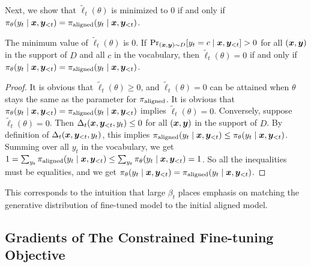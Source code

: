Next, we show that $\tilde{\ell}_t(\theta)$ is minimized to $0$ if and only if $\pi_{\theta}(y_t \mid \bm{x}, \bm{y}_{<t}) = \pi_{\mathrm{aligned}}(y_t \mid \bm{x}, \bm{y}_{<t})$.
\begin{theorem} \label{thm:relu_loss_min}
    The minimum value of $\tilde{\ell}_t(\theta)$ is $0$.
    If $\Pr_{(\bm{x}, \bm{y}) \sim D}[y_t = c \mid \bm{x}, \bm{y}_{<t}] > 0$ for all $(\bm{x}, \bm{y})$ in the support of $D$ and all $c$ in the vocabulary,
    then $\tilde{\ell}_t(\theta) = 0$ if and only if $\pi_{\theta}(y_t \mid \bm{x}, \bm{y}_{<t}) = \pi_{\mathrm{aligned}}(y_t \mid \bm{x}, \bm{y}_{<t})$.
\end{theorem}
\begin{proof}
    It is obvious that $\tilde{\ell}_t(\theta) \ge 0$, and $\tilde{\ell}_t(\theta) = 0$ can be attained when $\theta$ stays the same as the parameter for $\pi_{\mathrm{aligned}}$. It is obvious that  $\pi_{\theta}(y_t \mid \bm{x}, \bm{y}_{<t}) = \pi_{\mathrm{aligned}}(y_t \mid \bm{x}, \bm{y}_{<t})$
    implies $\tilde{\ell}_t(\theta) = 0$.
    Conversely, suppose $\tilde{\ell}_t(\theta) = 0$.
    Then $\Delta_t(\bm{x}, \bm{y}_{<t}, y_t) \le 0$ for all $(\bm{x}, \bm{y})$ in the support of $D$.
    By definition of $\Delta_t(\bm{x}, \bm{y}_{<t}, y_t)$, this implies $\pi_{\mathrm{aligned}}(y_t \mid \bm{x}, \bm{y}_{<t}) \le \pi_{\theta}(y_t \mid \bm{x}, \bm{y}_{<t})$.
    Summing over all $y_t$ in the vocabulary, we get $1 = \sum_{y_t} \pi_{\mathrm{aligned}}(y_t \mid \bm{x}, \bm{y}_{<t}) \le \sum_{y_t} \pi_{\theta}(y_t \mid \bm{x}, \bm{y}_{<t}) = 1$.
    So all the inequalities must be equalities, and we get $\pi_{\theta}(y_t \mid \bm{x}, \bm{y}_{<t}) = \pi_{\mathrm{aligned}}(y_t \mid \bm{x}, \bm{y}_{<t})$.
\end{proof}

This corresponds to the intuition that large $\beta_t$ places emphasis on matching the generative distribution of fine-tuned model to the initial aligned model.




\subsection{Gradients of The Constrained Fine-tuning Objective}
\label{appendix:loss_gradients}


